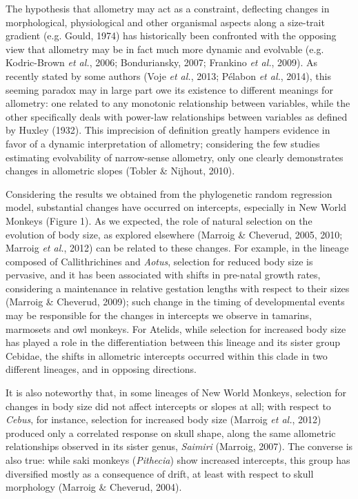 \documentclass[12pt,]{article}
\begin{document}
The hypothesis that allometry may act as a constraint, deflecting
changes in morphological, physiological and other organismal aspects
along a size-trait gradient (e.g. Gould, 1974) has historically been
confronted with the opposing view that allometry may be in fact much
more dynamic and evolvable (e.g. Kodric-Brown \emph{et al.}, 2006;
Bonduriansky, 2007; Frankino \emph{et al.}, 2009). As recently stated by
some authors (Voje \emph{et al.}, 2013; Pélabon \emph{et al.}, 2014),
this seeming paradox may in large part owe its existence to different
meanings for allometry: one related to any monotonic relationship
between variables, while the other specifically deals with power-law
relationships between variables as defined by Huxley (1932). This
imprecision of definition greatly hampers evidence in favor of a dynamic
interpretation of allometry; considering the few studies estimating
evolvability of narrow-sense allometry, only one clearly demonstrates
changes in allometric slopes (Tobler \& Nijhout, 2010).

Considering the results we obtained from the phylogenetic random
regression model, substantial changes have occurred on intercepts,
especially in New World Monkeys (Figure 1). As we expected, the role of
natural selection on the evolution of body size, as explored elsewhere
(Marroig \& Cheverud, 2005, 2010; Marroig \emph{et al.}, 2012) can be
related to these changes. For example, in the lineage composed of
Callithrichines and \emph{Aotus}, selection for reduced body size is
pervasive, and it has been associated with shifts in pre-natal growth
rates, considering a maintenance in relative gestation lengths with
respect to their sizes (Marroig \& Cheverud, 2009); such change in the
timing of developmental events may be responsible for the changes in
intercepts we observe in tamarins, marmosets and owl monkeys. For
Atelids, while selection for increased body size has played a role in
the differentiation between this lineage and its sister group Cebidae,
the shifts in allometric intercepts occurred within this clade in two
different lineages, and in opposing directions.

It is also noteworthy that, in some lineages of New World Monkeys,
selection for changes in body size did not affect intercepts or slopes
at all; with respect to \emph{Cebus}, for instance, selection for
increased body size (Marroig \emph{et al.}, 2012) produced only a
correlated response on skull shape, along the same allometric
relationships observed in its sister genus, \emph{Saimiri} (Marroig,
2007). The converse is also true: while saki monkeys (\emph{Pithecia})
show increased intercepts, this group has diversified mostly as a
consequence of drift, at least with respect to skull morphology (Marroig
\& Cheverud, 2004).
\end{document}
